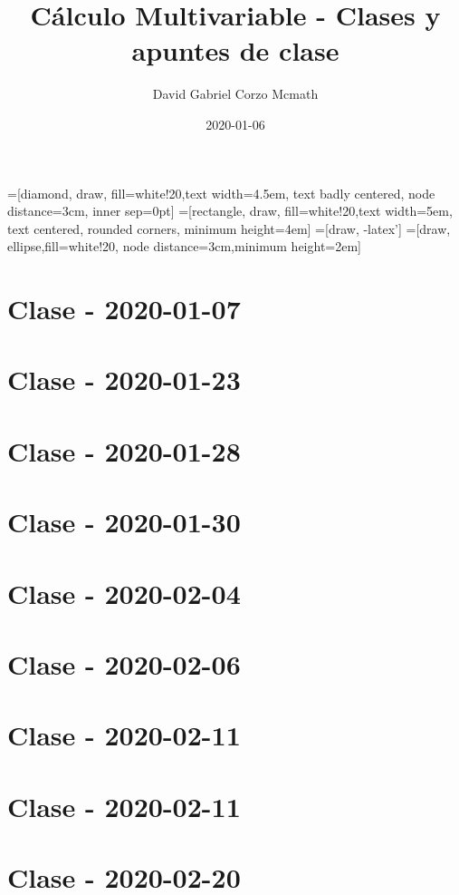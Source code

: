 \documentclass{book}
\title{Cálculo Multivariable - Clases y apuntes de clase}
\author{David Gabriel Corzo Mcmath}
\date{2020-01-06}
\begin{document}
\maketitle
\tableofcontents

=[diamond, draw, fill=white!20,text width=4.5em, text badly centered, node distance=3cm, inner sep=0pt]
=[rectangle, draw, fill=white!20,text width=5em, text centered, rounded corners, minimum height=4em]
=[draw, -latex']
=[draw, ellipse,fill=white!20, node distance=3cm,minimum height=2em]


\chapter{Clase - 2020-01-07}


\chapter{Clase - 2020-01-23}


\chapter{Clase - 2020-01-28}


\chapter{Clase - 2020-01-30}


\chapter{Clase - 2020-02-04}


\chapter{Clase - 2020-02-06}


\chapter{Clase - 2020-02-11}


\chapter{Clase - 2020-02-11}


\chapter{Clase - 2020-02-20}

\end{document}
